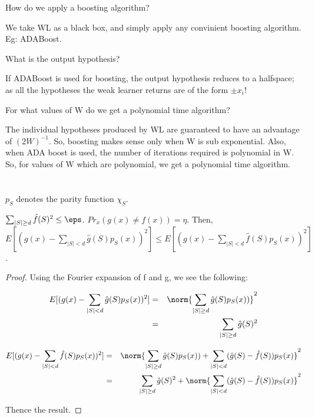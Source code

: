 \documentclass[10pt]{amsart}
\begin{document}
\begin{question}
How do we apply a boosting algorithm?
\end{question}
\begin{answer}
We take WL as a black box, and simply apply any convinient boosting algorithm. Eg: ADABoost.
\end{answer}

\begin{question}
What is the output hypothesis?
\end{question}
\begin{answer}
If ADABoost is used for boosting, the output hypothesis reduces to a halfspace; as all the hypotheses the weak learner returns are of the form $\pm x_{i}$!
\end{answer}

\begin{question}
For what values of W do we get a polynomial time algorithm?
\end{question}
\begin{answer}
The individual hypotheses produced by WL are guaranteed to have an advantage of $(2W)^{-1}$. So, boosting makes sense only when W is sub exponential. Also, when ADA boost is used, the number of iterations required is polynomial in W. So, for values of W which are polynomial, we get a polynomial time algorithm.
\end{answer}


\section{}
\begin{notation}
$p_{S}$ denotes the parity function $\chi_{S}$.
\end{notation}


\begin{thm}
$\sum_{|S|\geq d} \hat{f}(S)^{2} \leq \eps$. $Pr_{x}(g(x)\neq f(x)) = \eta$. Then, $E[(g(x)-\sum_{|S|<d}\hat{g}(S)p_{S}(x))^{2}] \leq E[(g(x)-\sum_{|S|<d}\hat{f}(S)p_{S}(x))^{2}]$.
\end{thm}
\begin{proof}
Using the Fourier expansion of f and g, we see the following:

\begin{eqnarray*}
E[(g(x)-\sum_{|S|<d}\hat{g}(S)p_{S}(x))^{2}] &=& \norm{\sum_{|S|\geq d}\hat{g}(S)p_{S}(x))}^{2}\\
&=& \sum_{|S|\geq d} \hat{g}(S)^{2}\\
\end{eqnarray*}


\begin{eqnarray*}
E[(g(x)-\sum_{|S|<d}\hat{f}(S)p_{S}(x))^{2}] &=& \norm{\sum_{|S|\geq d}\hat{g}(S)p_{S}(x))+ \sum_{|S|<d}(\hat{g}(S)-\hat{f}(S))p_{S}(x)}^{2}\\
&=& \sum_{|S|\geq d} \hat{g}(S)^{2} + \norm{\sum_{|S|<d}(\hat{g}(S)-\hat{f}(S))p_{S}(x)}^{2}\\
\end{eqnarray*}

Thence the result.
\end{proof}
\end{document}
